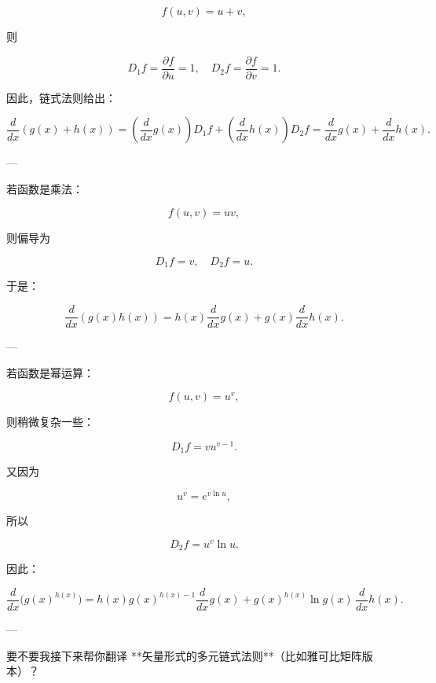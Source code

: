 $$
f(u,v) = u+v,
$$

则

$$
D_{1}f = \frac{\partial f}{\partial u} = 1, 
\quad D_{2}f = \frac{\partial f}{\partial v} = 1.
$$

因此，链式法则给出：

$$
\frac{d}{dx}(g(x)+h(x)) 
= \left(\frac{d}{dx} g(x)\right)D_{1}f 
+ \left(\frac{d}{dx} h(x)\right)D_{2}f 
= \frac{d}{dx} g(x) + \frac{d}{dx} h(x).
$$

---

若函数是乘法：

$$
f(u,v) = uv,
$$

则偏导为

$$
D_{1}f = v, 
\quad D_{2}f = u.
$$

于是：

$$
\frac{d}{dx}(g(x)h(x)) 
= h(x)\frac{d}{dx}g(x) + g(x)\frac{d}{dx}h(x).
$$

---

若函数是幂运算：

$$
f(u,v) = u^v,
$$

则稍微复杂一些：

$$
D_{1}f = vu^{v-1}.
$$

又因为

$$
u^v = e^{v\ln u},
$$

所以

$$
D_{2}f = u^v \ln u.
$$

因此：

$$
\frac{d}{dx}\bigl(g(x)^{h(x)}\bigr) 
= h(x) g(x)^{h(x)-1} \frac{d}{dx} g(x) 
+ g(x)^{h(x)} \ln g(x)\, \frac{d}{dx} h(x).
$$

---

要不要我接下来帮你翻译 **矢量形式的多元链式法则**（比如雅可比矩阵版本）？

